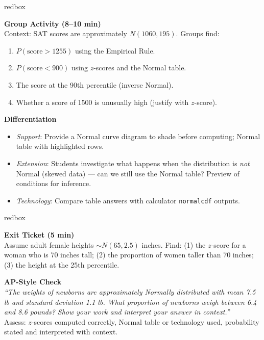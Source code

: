 \documentclass[10pt]{article}
\begin{document}
\begin{skillbox}{redbox}
\begin{minipage}[t]{0.48\linewidth}
    \textbf{Group Activity (8--10 min)}\\
    Context: SAT scores are approximately $N(1060, 195)$. Groups find:
    \begin{enumerate}
        \item $P(\text{score} > 1255)$ using the Empirical Rule.
        \item $P(\text{score} < 900)$ using $z$-scores and the Normal table.
        \item The score at the 90th percentile (inverse Normal).
        \item Whether a score of 1500 is unusually high (justify with $z$-score).
    \end{enumerate}
\end{minipage}
\hfill
\begin{minipage}[t]{0.48\linewidth}
    \textbf{Differentiation}
    \begin{itemize}
        \item \textit{Support}: Provide a Normal curve diagram to shade before computing; Normal table with highlighted rows.
        \item \textit{Extension}: Students investigate what happens when the distribution is \textit{not} Normal (skewed data) --- can we still use the Normal table? Preview of conditions for inference.
        \item \textit{Technology}: Compare table answers with calculator \texttt{normalcdf} outputs.
    \end{itemize}
\end{minipage}
\end{skillbox}

\begin{skillbox}{redbox}
\begin{minipage}[t]{0.48\linewidth}
    \textbf{Exit Ticket (5 min)}\\
    Assume adult female heights $\sim N(65, 2.5)$ inches. Find: (1) the $z$-score for a woman who is 70 inches tall; (2) the proportion of women taller than 70 inches; (3) the height at the 25th percentile.
\end{minipage}
\hfill
\begin{minipage}[t]{0.48\linewidth}
    \textbf{AP-Style Check}\\
    \textit{``The weights of newborns are approximately Normally distributed with mean 7.5 lb and standard deviation 1.1 lb. What proportion of newborns weigh between 6.4 and 8.6 pounds? Show your work and interpret your answer in context.''}\\[4pt]
    Assess: $z$-scores computed correctly, Normal table or technology used, probability stated and interpreted with context.
\end{minipage}
\end{skillbox}
\end{document}
